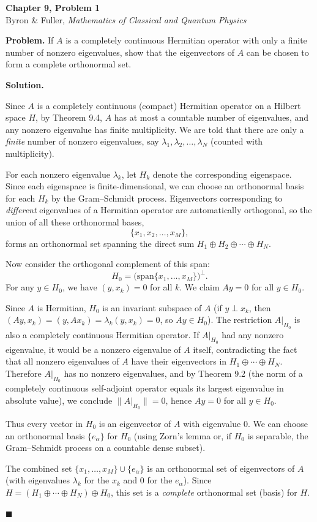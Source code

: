 \documentclass[12pt]{article}
\begin{document}
\begin{center}
{\Large\bfseries Chapter 9, Problem 1}\\[6pt]
Byron \& Fuller, \textit{Mathematics of Classical and Quantum Physics}
\end{center}

\bigskip

\textbf{Problem.} If $A$ is a completely continuous Hermitian operator with only a finite number of nonzero eigenvalues, show that the eigenvectors of $A$ can be chosen to form a complete orthonormal set.

\bigskip
\textbf{Solution.}

Since $A$ is a completely continuous (compact) Hermitian operator on a Hilbert space $H$, by Theorem 9.4, $A$ has at most a countable number of eigenvalues, and any nonzero eigenvalue has finite multiplicity. We are told that there are only a \emph{finite} number of nonzero eigenvalues, say $\lambda_1, \lambda_2, \ldots, \lambda_N$ (counted with multiplicity).

For each nonzero eigenvalue $\lambda_k$, let $H_k$ denote the corresponding eigenspace. Since each eigenspace is finite-dimensional, we can choose an orthonormal basis for each $H_k$ by the Gram--Schmidt process. Eigenvectors corresponding to \emph{different} eigenvalues of a Hermitian operator are automatically orthogonal, so the union of all these orthonormal bases,
\[
\{x_1, x_2, \ldots, x_M\},
\]
forms an orthonormal set spanning the direct sum $H_1 \oplus H_2 \oplus \cdots \oplus H_N$.

Now consider the orthogonal complement of this span:
\[
H_0 = \bigl(\text{span}\{x_1, \ldots, x_M\}\bigr)^\perp.
\]
For any $y \in H_0$, we have $(y, x_k) = 0$ for all $k$. We claim $Ay = 0$ for all $y \in H_0$.

Since $A$ is Hermitian, $H_0$ is an invariant subspace of $A$ (if $y \perp x_k$, then $(Ay, x_k) = (y, Ax_k) = \lambda_k(y, x_k) = 0$, so $Ay \in H_0$). The restriction $A|_{H_0}$ is also a completely continuous Hermitian operator. If $A|_{H_0}$ had any nonzero eigenvalue, it would be a nonzero eigenvalue of $A$ itself, contradicting the fact that all nonzero eigenvalues of $A$ have their eigenvectors in $H_1 \oplus \cdots \oplus H_N$. Therefore $A|_{H_0}$ has no nonzero eigenvalues, and by Theorem 9.2 (the norm of a completely continuous self-adjoint operator equals its largest eigenvalue in absolute value), we conclude $\|A|_{H_0}\| = 0$, hence $Ay = 0$ for all $y \in H_0$.

Thus every vector in $H_0$ is an eigenvector of $A$ with eigenvalue $0$. We can choose an orthonormal basis $\{e_\alpha\}$ for $H_0$ (using Zorn's lemma or, if $H_0$ is separable, the Gram--Schmidt process on a countable dense subset).

The combined set $\{x_1, \ldots, x_M\} \cup \{e_\alpha\}$ is an orthonormal set of eigenvectors of $A$ (with eigenvalues $\lambda_k$ for the $x_k$ and $0$ for the $e_\alpha$). Since $H = (H_1 \oplus \cdots \oplus H_N) \oplus H_0$, this set is a \emph{complete} orthonormal set (basis) for $H$.

\hfill $\blacksquare$
\end{document}
